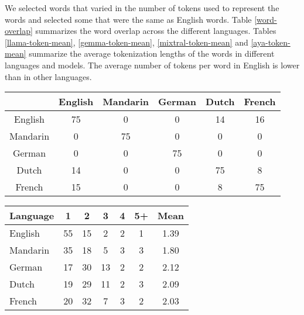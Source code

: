 We selected words that varied in the number of tokens used to represent the words and selected some that were the same as English words. Table \ref{word-overlap} summarizes the word overlap across the different languages.  Tables \ref{llama-token-mean}, \ref{gemma-token-mean}, \ref{mixtral-token-mean} and \ref{aya-token-mean} summarize the average tokenization lengths of the words in different languages and models. The average number of tokens per word in English is lower than in other languages. 

\begin{table*}[h]
\caption{Word overlap between languages}
\label{word-overlap}
\vskip 0.15in
\begin{center}
\begin{small}
\begin{sc}
\begin{tabular}{ c c c c c c }
\toprule
 & English & Mandarin & German & Dutch & French \\ \midrule
English & 75 & 0 & 0 & 14 & 16 \\
Mandarin & 0 & 75 & 0 & 0 & 0 \\
German & 0 & 0 & 75 & 0 &0 \\
Dutch & 14 & 0& 0 & 75 & 8 \\
French &  15 & 0 & 0 & 8 & 75 \\
\bottomrule
\end{tabular}
\end{sc}
\end{small}
\end{center}
\vskip -0.1in
\end{table*}

\begin{table*}[h]
\caption{\llama \ tokenization statistics}
\label{llama-token-mean}
\vskip 0.15in
\begin{center}
\begin{small}
\begin{sc}
\begin{tabular}{ l cccccc}
\toprule
Language & 1 & 2 & 3 & 4 & 5+ & Mean \\ \midrule
English & 55 & 15 & 2 & 2 & 1 & 1.39 \\
Mandarin & 35 & 18 & 5 & 3 & 3 & 1.80 \\
German & 17 & 30 & 13 & 2 & 2 & 2.12 \\
Dutch & 19 & 29 & 11 & 2 & 3 & 2.09 \\
French & 20 & 32 & 7 & 3 & 2 & 2.03 \\
\bottomrule
\end{tabular}
\end{sc}
\end{small}
\end{center}
\vskip -0.1in
\end{table*}

